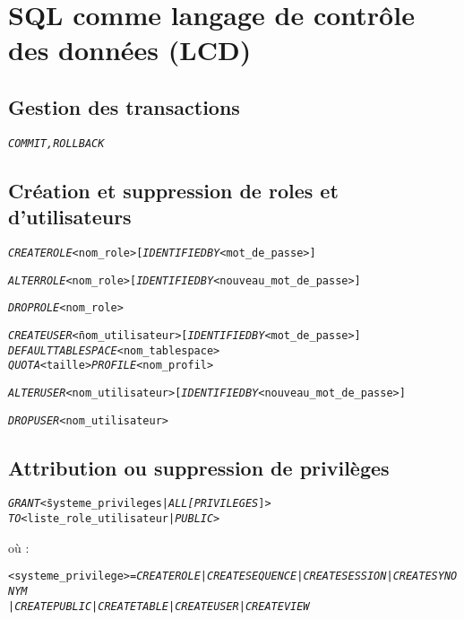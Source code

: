 \documentclass[10pt]{article}
\begin{document}
	\section{SQL comme langage de contrôle des données (LCD)}
		\subsection{Gestion des transactions}
			\begin{alltt}
				\emph{COMMIT, ROLLBACK}
			\end{alltt}
			
		\subsection{Création et suppression de roles et d'utilisateurs}
			\begin{alltt}
				\emph{CREATE ROLE} <nom_role> [\emph{IDENTIFIED BY} <mot_de_passe>]
				
				\emph{ALTER ROLE} <nom_role> [\emph{IDENTIFIED BY} <nouveau_mot_de_passe>]
				
				\emph{DROP ROLE} <nom_role>
				\begin{tabbing}
					\emph{CREATE USER} \= <nom_utilisateur> [\emph{IDENTIFIED BY} <mot_de_passe>]\\
					\emph{DEFAULT TABLESPACE} <nom_tablespace>\\
					\emph{QUOTA} \> <taille> \emph{PROFILE} <nom_profil>
				\end{tabbing}
				\emph{ALTER USER} <nom_utilisateur> [\emph{IDENTIFIED BY} <nouveau_mot_de_passe>]
				
				\emph{DROP USER} <nom_utilisateur>
			\end{alltt}
			
		\subsection{Attribution ou suppression de privilèges}
			\begin{alltt}
				\begin{tabbing}
					\emph{GRANT} \= <systeme_privileges | \emph{ALL} \emph{[PRIVILEGES}]>\\
					\emph{TO} \> <liste_role_utilisateur | \emph{PUBLIC}>\\
					[\emph{WITH ADMIN OPTION}]
				\end{tabbing}
			\end{alltt}
			
			où :
			\begin{alltt}
				\begin{tabbing}
					<systeme_privilege> = \= \emph{CREATE ROLE} | \emph{CREATE SEQUENCE} | \emph{CREATE SESSION} | \emph{CREATE SYNONYM}\\
					\>  | \emph{CREATE PUBLIC} | \emph{CREATE TABLE} | \emph{CREATE USER} | \emph{CREATE VIEW}
				\end{tabbing}
			\end{alltt}
			
\end{document}
